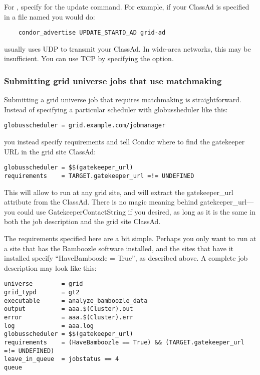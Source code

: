 For , specify  for
the update command. For example, if your ClassAd is specified in a
file named  you would do:

\footnotesize
\begin{verbatim}
    condor_advertise UPDATE_STARTD_AD grid-ad
\end{verbatim}
\normalsize

 usually uses UDP to transmit your ClassAd. In
wide-area networks, this may be insufficient. You can use TCP by
specifying the  option. 

\subsubsection{Submitting grid universe jobs that use matchmaking}

Submitting a grid universe job that requires matchmaking is
straightforward. Instead of specifying a particular scheduler with
globussheduler like this:

\footnotesize
\begin{verbatim}
globusscheduler = grid.example.com/jobmanager
\end{verbatim}
\normalsize

you instead specify requirements and tell Condor where to find the
gatekeeper URL in the grid site ClassAd:

\footnotesize
\begin{verbatim}
globusscheduler = $$(gatekeeper_url)
requirements    = TARGET.gatekeeper_url =!= UNDEFINED
\end{verbatim}
\normalsize

This will allow to run at any grid site, and will extract the
gatekeeper\_url attribute from the ClassAd. There is no magic meaning
behind gatekeeper\_url---you could use GatekeeperContactString if you
desired, as long as it is the same in both the job description and the
grid site ClassAd. 

The requirements specified here are a bit simple. Perhaps you only
want to run at a site that has the Bamboozle software installed, and
the sites that have it installed specify ``HaveBamboozle = True'', as
described above. A complete job description may look like this:

\footnotesize
\begin{verbatim}
universe        = grid
grid_typd       = gt2
executable      = analyze_bamboozle_data
output          = aaa.$(Cluster).out
error           = aaa.$(Cluster).err
log             = aaa.log
globusscheduler = $$(gatekeeper_url)
requirements    = (HaveBamboozle == True) && (TARGET.gatekeeper_url =!= UNDEFINED)
leave_in_queue  = jobstatus == 4
queue
\end{verbatim}
\normalsize

